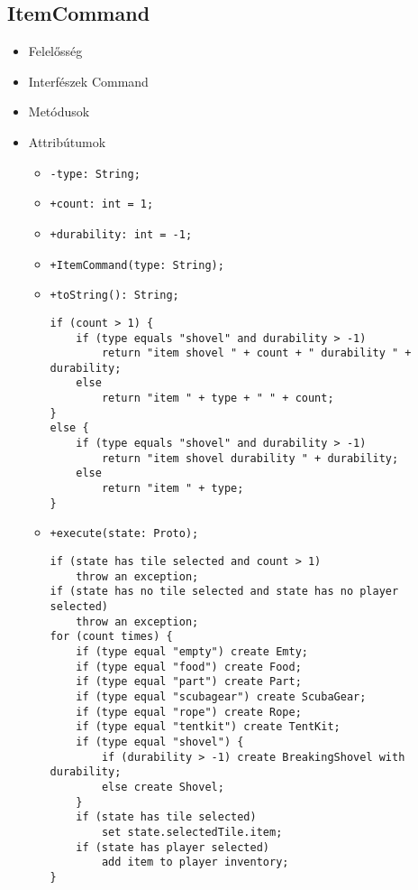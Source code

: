 \subsection{ItemCommand}
\begin{itemize}
\item Felelősség\newline
\item Interfészek\newline
Command
\item Metódusok
\item Attribútumok
	\begin{itemize}
		\item \texttt{-type: String;}
		\item \texttt{+count: int = 1;}
		\item \texttt{+durability: int = -1;}	
	\end{itemize}
\begin{itemize}
		\item \texttt{+ItemCommand(type: String);}
		\item \texttt{+toString(): String;}
		\begin{lstlisting}
if (count > 1) {
	if (type equals "shovel" and durability > -1)
		return "item shovel " + count + " durability " + durability; 
	else 
		return "item " + type + " " + count;
}
else {
	if (type equals "shovel" and durability > -1)
		return "item shovel durability " + durability; 
	else 
		return "item " + type;
}
		\end{lstlisting}
		\item \texttt{+execute(state: Proto);}
		\begin{lstlisting}
if (state has tile selected and count > 1)
	throw an exception;
if (state has no tile selected and state has no player selected)
	throw an exception;
for (count times) {
	if (type equal "empty") create Emty;
	if (type equal "food") create Food;
	if (type equal "part") create Part;
	if (type equal "scubagear") create ScubaGear;
	if (type equal "rope") create Rope;
	if (type equal "tentkit") create TentKit;
	if (type equal "shovel") {
		if (durability > -1) create BreakingShovel with durability;
		else create Shovel;
	}
	if (state has tile selected)
		set state.selectedTile.item;
	if (state has player selected)
		add item to player inventory;
}	
		\end{lstlisting}
	\end{itemize}
\end{itemize}
